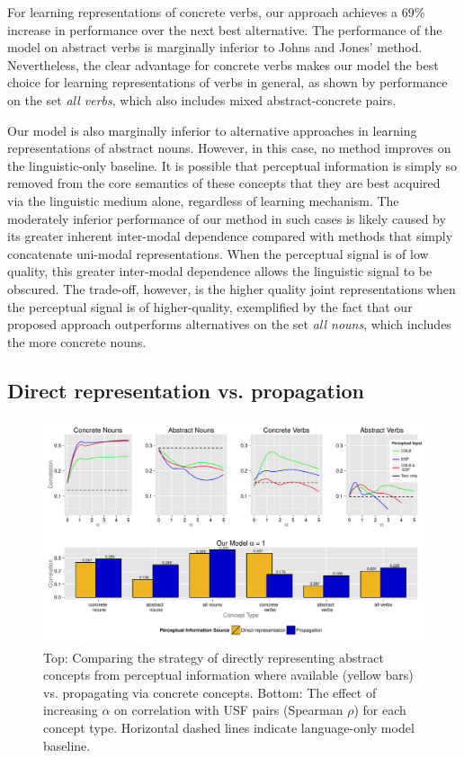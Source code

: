 \documentclass[11pt]{article}
\begin{document}
For learning representations of concrete verbs, our approach achieves a 69\% increase in performance over the next best alternative. The performance of the model on abstract verbs is marginally inferior to Johns and Jones' method. Nevertheless, the clear advantage for concrete verbs makes our model the best choice for learning representations of verbs in general, as shown by performance on the set \emph{all verbs}, which also includes mixed abstract-concrete pairs. 

Our model is also marginally inferior to alternative approaches in learning representations of abstract nouns. However, in this case, no method improves on the linguistic-only baseline. It is possible that perceptual information is simply so removed from the core semantics of these concepts that they are best acquired via the linguistic medium alone, regardless of learning mechanism. The moderately inferior performance of our method in such cases is likely caused by its greater inherent inter-modal dependence compared with methods that simply concatenate uni-modal representations. When the perceptual signal is of low quality, this greater inter-modal dependence allows the linguistic signal to be obscured. The trade-off, however, is the higher quality joint representations when the perceptual signal is of higher-quality, exemplified by the fact that our proposed approach outperforms alternatives on the set \emph{all nouns}, which includes the more concrete nouns. 

\subsection{Direct representation vs. propagation}

 \begin{figure}[t] 

\includegraphics[width = \textwidth]{Graph_2}  

\caption{Top: Comparing the strategy of directly representing abstract concepts from perceptual information where available (yellow bars) vs. propagating via concrete concepts. Bottom: The effect of increasing \(\alpha\) on correlation with USF pairs (Spearman \(\rho\)) for each concept type. Horizontal dashed lines indicate language-only model baseline.}

\end{figure}
\end{document}
